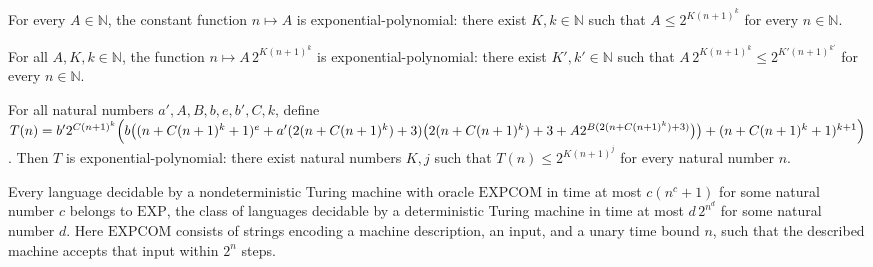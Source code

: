\begin{theorem}
\label{Complexity.expcom_expPoly_const}
\leanok
{}
For every $A\in\mathbb{N}$, the constant function $n\mapsto A$ is
exponential-polynomial: there exist $K,k\in\mathbb{N}$ such that $A\le 2^{K(n+1)^k}$ for
every $n\in\mathbb{N}$.
\end{theorem}

\begin{theorem}
\label{Complexity.expcom_expPoly_mul_two_pow}
\leanok
{}
For all $A,K,k\in\mathbb{N}$, the function $n\mapsto A\,2^{K(n+1)^k}$ is
exponential-polynomial: there exist $K',k'\in\mathbb{N}$ such that $A\,2^{K(n+1)^k}\le
2^{K'(n+1)^{k'}}$ for every $n\in\mathbb{N}$.
\end{theorem}

\begin{theorem}
\label{Complexity.expcom_summit_budget}
\leanok
{}
For all natural numbers $a',A,B,b,e,b',C,k$, define
$T(n)=b'2^{C(n+1)^k}\Bigl(b\bigl((n+C(n+1)^k+1)^e+a'(2(n+C(n+1)^k)+3)\bigl(2(n+C(n+1)^k)+3+A2^{B(2(n+C(n+1)^k)+3)}\bigr)\bigr)+(n+C(n+1)^k+1)^{k+1}\Bigr)$.
Then $T$ is exponential-polynomial: there exist natural numbers $K,j$ such that
$T(n)\leq 2^{K(n+1)^j}$ for every natural number $n$.
\end{theorem}

\begin{theorem}
\label{Complexity.NPOracle_EXPCOM_subset_EXP}
\leanok
{}
Every language decidable by a nondeterministic Turing machine with oracle
$\mathrm{EXPCOM}$ in time at most $c(n^c+1)$ for some natural number $c$ belongs
to $\mathrm{EXP}$, the class of languages decidable by a deterministic Turing machine
in time at most $d\,2^{n^d}$ for some natural number $d$. Here $\mathrm{EXPCOM}$
consists of strings encoding a machine description, an input, and a unary time bound
$n$, such that the described machine accepts that input within $ 2^n$ steps.
\end{theorem}

